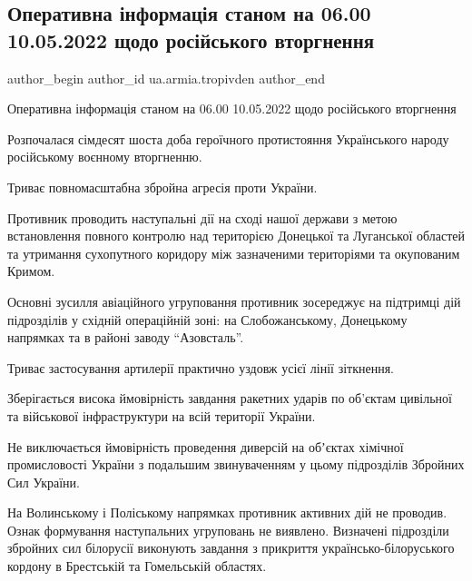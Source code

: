  
 
 
 
 
 
\subsection{Оперативна інформація станом на 06.00 10.05.2022 щодо російського вторгнення}
\label{sec:10_05_2022.fb.ua.armia.tropivden.1.operatyvna_informacia}
 
\ifcmt
 author_begin
   author_id ua.armia.tropivden
 author_end
\fi

Оперативна інформація станом на 06.00 10.05.2022 щодо російського вторгнення

Розпочалася сімдесят шоста доба героїчного протистояння Українського народу
російському воєнному вторгненню.

Триває повномасштабна збройна агресія проти України. 

Противник проводить наступальні дії на сході нашої держави з метою встановлення
повного контролю над територією Донецької та Луганської областей та утримання
сухопутного коридору між зазначеними територіями та окупованим Кримом. 

Основні зусилля авіаційного угруповання противник зосереджує на підтримці дій
підрозділів у східній операційній зоні: на Слобожанському, Донецькому напрямках
та в районі заводу \enquote{Азовсталь}.

Триває застосування артилерії практично уздовж усієї лінії зіткнення.

Зберігається висока ймовірність завдання ракетних ударів по об’єктам цивільної
та військової інфраструктури на всій території України.

Не виключається ймовірність проведення диверсій на обʼєктах хімічної
промисловості України з подальшим звинуваченням у цьому підрозділів Збройних
Сил України.

На Волинському і Поліському напрямках противник активних дій не проводив. Ознак
формування наступальних угруповань не виявлено. Визначені підрозділи збройних
сил білорусії виконують завдання з прикриття українсько-білоруського кордону в
Брестській та Гомельській областях.

